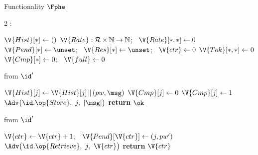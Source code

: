 \begin{interface}[nofloat]{Functionality $\Fphe$ \\
}

{\scriptsize
\setlength{\columnsep}{1.4em}
\begin{multicols}{2}
:
\begin{algorithmic}[1]
\setcounter{contline}{0}\algcont
\State $\V{Hist}[*] \gets ()$
\State $\V{Rate} : \mathcal{R} \times \mathbb{N} \to \mathbb{N}$; \ $\V{Rate}[*,*] \gets 0$
\State $\V{Pend}[*] \gets \unset$; \ $\V{Res}[*] \gets \unset$; \ $\V{ctr} \gets 0$
\State $\V{Tok}[*,*] \gets 0$
\State $\V{Cmp}[*] \gets 0$; \ $\V{full} \gets 0$
\algsave
\end{algorithmic}
\vspace{1.4ex}

 \quad from $\id'$
\begin{algorithmic}[1]
\algcont
{}
\State $\V{Hist}[j] \gets \V{Hist}[j] \,\|\, (pw, \msg)$ \label{ln:phestore}
\State $\V{Cmp}[j] \gets 0$
  \State $\V{Cmp}[j] \gets 1$ \label{ln:phecmpnow}
\EndIf
\State $\Adv\bigl(\id.\op{Store},\ j,\ |\msg|\bigr)$ \label{ln:pheleakstore}
\State \textbf{return} $\ok$
\algsave
\end{algorithmic}
\vspace{1.4ex}

 \quad from $\id'$
\begin{algorithmic}[1]
\algcont
{}
\State $\V{ctr} \gets \V{ctr} + 1$; \ $\V{Pend}[\V{ctr}] \gets (j, pw')$
\State $\Adv\bigl(\id.\op{Retrieve},\ j,\ \V{ctr}\bigr)$ \label{ln:pheleakret}
\State \textbf{return} $\V{ctr}$
\algsave
\end{algorithmic}
\vspace{1.4ex}


\end{multicols}}
\end{interface}
